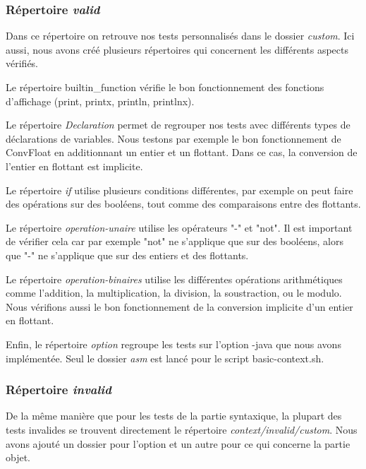 \documentclass[12pt, a4paper, one side]{article}
\begin{document}
\subsubsection{Répertoire \textit{valid}}
Dans ce répertoire on retrouve nos tests personnalisés dans le dossier \textit{custom}. Ici aussi, nous avons créé plusieurs répertoires qui concernent les différents aspects vérifiés.

\begin{flushleft}
Le répertoire builtin\_function vérifie le bon fonctionnement des fonctions d'affichage (print, printx, println, printlnx).
\end{flushleft}
\begin{flushleft}
Le répertoire \textit{Declaration} permet de regrouper nos tests avec différents types de déclarations de variables. Nous testons par exemple le bon fonctionnement de ConvFloat en additionnant un entier et un flottant. Dans ce cas, la conversion de l'entier en flottant est implicite.
\end{flushleft}
\begin{flushleft}
Le répertoire \textit{if} utilise plusieurs conditions différentes, par exemple on peut faire des opérations sur des booléens, tout comme des comparaisons entre des flottants.
\end{flushleft}
\begin{flushleft}
Le répertoire \textit{operation-unaire} utilise les opérateurs "-" et "not". Il est important de vérifier cela car par exemple "not" ne s'applique que sur des booléens, alors que "-" ne s'applique que sur des entiers et des flottants.
\end{flushleft}
\begin{flushleft}
Le répertoire \textit{operation-binaires} utilise les différentes opérations arithmétiques comme l'addition, la multiplication, la division, la soustraction, ou le modulo. Nous vérifions aussi le bon fonctionnement de la conversion implicite d'un entier en flottant.
\end{flushleft}
\begin{flushleft}
Enfin, le répertoire \textit{option} regroupe les tests sur l'option -java que nous avons implémentée. Seul le dossier \textit{asm} est lancé pour le script basic-context.sh.
\end{flushleft}

\subsubsection{Répertoire \textit{invalid}}
De la même manière que pour les tests de la partie syntaxique, la plupart des tests invalides se trouvent directement le répertoire \textit{context/invalid/custom}. Nous avons ajouté un dossier pour l'option et un autre pour ce qui concerne la partie objet.
\end{document}
